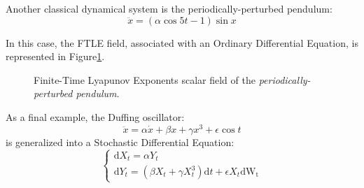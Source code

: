 \documentclass{juliacon}
\newcommand{\drv}{\textrm{d}}
\begin{document}
Another classical dynamical system is the periodically-perturbed pendulum:
\begin{equation}
\ddot{x}=(\alpha \cos5t -1 )\sin x
\end{equation}

In this case, the FTLE field, associated with an Ordinary Differential Equation, is represented in Figure\ref{fig:ppp}.

\begin{figure}[h]
    \centering
    \caption{Finite-Time Lyapunov Exponents scalar field of the \emph{periodically-perturbed pendulum}.}\label{fig:ppp}
\end{figure}



As a final example, the Duffing oscillator:
\begin{equation}
\ddot{x}=\alpha \dot{x}+\beta x+\gamma x^3 + \epsilon\cos{t}
\end{equation}
is generalized into a Stochastic Differential Equation: 
\begin{equation}
    \begin{cases}
    \drv X_t= \alpha Y_t \\
    \drv Y_t = (\beta X_t + \gamma X_t^3)\drv t +\epsilon X_t \drv \mathrm{W_t} 
\end{cases}
\end{equation}
\end{document}
